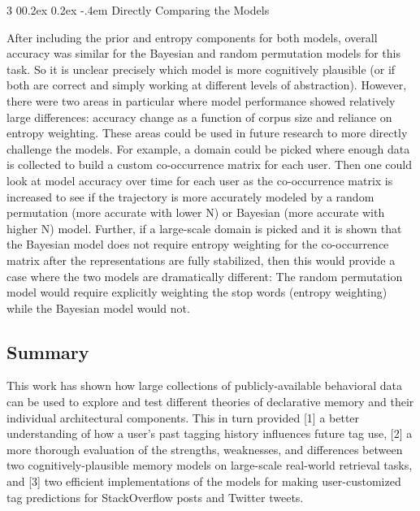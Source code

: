 \documentclass[man,floatsintext,donotrepeattitle]{apa6}
\makeatletter
\renewcommand{\subsubsection}{%
  \@startsection
  {subsubsection}%
  {3}%
  {\parindent}%
  {0\baselineskip \@plus 0.2ex \@minus 0.2ex}%
  {-.4em}%
  {\normalfont\normalsize\bfseries\addperi}}
\makeatother
\begin{document}
\subsubsection{Directly Comparing the Models}

After including the prior and entropy components for both models, overall accuracy was similar for the Bayesian and random permutation models for this task.
So it is unclear precisely which model is more cognitively plausible (or if both are correct and simply working at different levels of abstraction).
However, there were two areas in particular where model performance showed relatively large differences: accuracy change as a function of corpus size and reliance on entropy weighting.
These areas could be used in future research to more directly challenge the models.
For example, a domain could be picked where enough data is collected to build a custom co-occurrence matrix for each user.
Then one could look at model accuracy over time for each user as the co-occurrence matrix is increased to see if the trajectory is more accurately modeled by a random permutation (more accurate with lower N) or Bayesian (more accurate with higher N) model.
Further, if a large-scale domain is picked and it is shown that the Bayesian model does not require entropy weighting for the co-occurrence matrix after the representations are fully stabilized,
then this would provide a case where the two models are dramatically different: The random permutation model would require explicitly weighting the stop words (entropy weighting) while the Bayesian model would not.

\subsection{Summary}

This work has shown how large collections of publicly-available behavioral data can be used to explore and test different theories of declarative memory and their individual architectural components.
This in turn provided [1] a better understanding of how a user's past tagging history influences future tag use,
[2] a more thorough evaluation of the strengths, weaknesses, and differences between two cognitively-plausible memory models on large-scale real-world retrieval tasks,
and [3] two efficient implementations of the models for making user-customized tag predictions for StackOverflow posts and Twitter tweets. 
\end{document}
